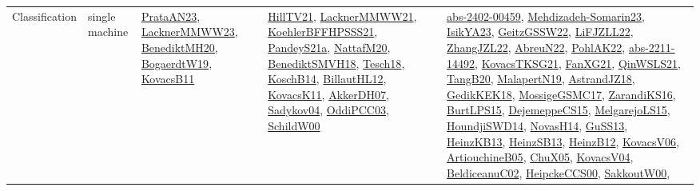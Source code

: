 {\begin{longtable}{llp{6cm}p{6cm}p{6cm}}
Classification & single machine & \href{articles/PrataAN23.pdf}{PrataAN23}\cite{PrataAN23}, \href{articles/LacknerMMWW23.pdf}{LacknerMMWW23}\cite{LacknerMMWW23}, \href{articles/BenediktMH20.pdf}{BenediktMH20}\cite{BenediktMH20}, \href{papers/BogaerdtW19.pdf}{BogaerdtW19}\cite{BogaerdtW19}, \href{articles/KovacsB11.pdf}{KovacsB11}\cite{KovacsB11} & \href{papers/HillTV21.pdf}{HillTV21}\cite{HillTV21}, \href{papers/LacknerMMWW21.pdf}{LacknerMMWW21}\cite{LacknerMMWW21}, \href{articles/KoehlerBFFHPSSS21.pdf}{KoehlerBFFHPSSS21}\cite{KoehlerBFFHPSSS21}, \href{articles/PandeyS21a.pdf}{PandeyS21a}\cite{PandeyS21a}, \href{papers/NattafM20.pdf}{NattafM20}\cite{NattafM20}, \href{papers/BenediktSMVH18.pdf}{BenediktSMVH18}\cite{BenediktSMVH18}, \href{papers/Tesch18.pdf}{Tesch18}\cite{Tesch18}, \href{papers/KoschB14.pdf}{KoschB14}\cite{KoschB14}, \href{papers/BillautHL12.pdf}{BillautHL12}\cite{BillautHL12}, \href{articles/KovacsK11.pdf}{KovacsK11}\cite{KovacsK11}, \href{papers/AkkerDH07.pdf}{AkkerDH07}\cite{AkkerDH07}, \href{papers/Sadykov04.pdf}{Sadykov04}\cite{Sadykov04}, \href{papers/OddiPCC03.pdf}{OddiPCC03}\cite{OddiPCC03}, \href{articles/SchildW00.pdf}{SchildW00}\cite{SchildW00} & \href{articles/abs-2402-00459.pdf}{abs-2402-00459}\cite{abs-2402-00459}, \href{papers/Mehdizadeh-Somarin23.pdf}{Mehdizadeh-Somarin23}\cite{Mehdizadeh-Somarin23}, \href{articles/IsikYA23.pdf}{IsikYA23}\cite{IsikYA23}, \href{papers/GeitzGSSW22.pdf}{GeitzGSSW22}\cite{GeitzGSSW22}, \href{papers/LiFJZLL22.pdf}{LiFJZLL22}\cite{LiFJZLL22}, \href{papers/ZhangJZL22.pdf}{ZhangJZL22}\cite{ZhangJZL22}, \href{articles/AbreuN22.pdf}{AbreuN22}\cite{AbreuN22}, \href{articles/PohlAK22.pdf}{PohlAK22}\cite{PohlAK22}, \href{articles/abs-2211-14492.pdf}{abs-2211-14492}\cite{abs-2211-14492}, \href{papers/KovacsTKSG21.pdf}{KovacsTKSG21}\cite{KovacsTKSG21}, \href{articles/FanXG21.pdf}{FanXG21}\cite{FanXG21}, \href{articles/QinWSLS21.pdf}{QinWSLS21}\cite{QinWSLS21}, \href{papers/TangB20.pdf}{TangB20}\cite{TangB20}, \href{papers/MalapertN19.pdf}{MalapertN19}\cite{MalapertN19}, \href{papers/AstrandJZ18.pdf}{AstrandJZ18}\cite{AstrandJZ18}, \href{articles/GedikKEK18.pdf}{GedikKEK18}\cite{GedikKEK18}, \href{papers/MossigeGSMC17.pdf}{MossigeGSMC17}\cite{MossigeGSMC17}, \href{articles/ZarandiKS16.pdf}{ZarandiKS16}\cite{ZarandiKS16}, \href{papers/BurtLPS15.pdf}{BurtLPS15}\cite{BurtLPS15}, \href{papers/DejemeppeCS15.pdf}{DejemeppeCS15}\cite{DejemeppeCS15}, \href{papers/MelgarejoLS15.pdf}{MelgarejoLS15}\cite{MelgarejoLS15}, \href{papers/HoundjiSWD14.pdf}{HoundjiSWD14}\cite{HoundjiSWD14}, \href{articles/NovasH14.pdf}{NovasH14}\cite{NovasH14}, \href{papers/GuSS13.pdf}{GuSS13}\cite{GuSS13}, \href{papers/HeinzKB13.pdf}{HeinzKB13}\cite{HeinzKB13}, \href{articles/HeinzSB13.pdf}{HeinzSB13}\cite{HeinzSB13}, \href{papers/HeinzB12.pdf}{HeinzB12}\cite{HeinzB12}, \href{papers/KovacsV06.pdf}{KovacsV06}\cite{KovacsV06}, \href{papers/ArtiouchineB05.pdf}{ArtiouchineB05}\cite{ArtiouchineB05}, \href{papers/ChuX05.pdf}{ChuX05}\cite{ChuX05}, \href{papers/KovacsV04.pdf}{KovacsV04}\cite{KovacsV04}, \href{papers/BeldiceanuC02.pdf}{BeldiceanuC02}\cite{BeldiceanuC02}, \href{articles/HeipckeCCS00.pdf}{HeipckeCCS00}\cite{HeipckeCCS00}, \href{articles/SakkoutW00.pdf}{SakkoutW00}\cite{SakkoutW00}, 
\end{longtable}}
